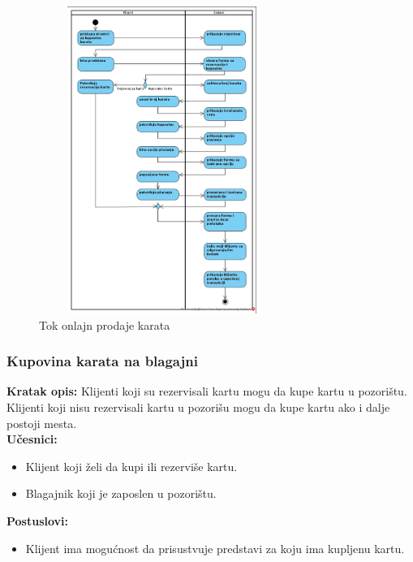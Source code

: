 \documentclass[a4paper]{article}
\begin{document}
        \newpage
        \begin{figure}[H]
          \begin{center}
              \includegraphics[width=80mm,height=100mm]{../images/activity_prodaja_karata.jpg}
          \end{center}
          \caption{Tok onlajn prodaje karata}
          \label{activity_prodaja_karata}
        \end{figure}

\subsubsection{Kupovina karata na blagajni}
\noindent\textbf{Kratak opis:} Klijenti koji su rezervisali kartu mogu da kupe kartu u pozorištu.
Klijenti koji nisu rezervisali kartu u pozorišu mogu da kupe kartu ako i dalje postoji mesta.\\

\noindent\textbf{Učesnici:} 
  \begin{itemize}
    \item Klijent koji želi da kupi ili rezerviše kartu.
    \item Blagajnik koji je zaposlen u pozorištu.
  \end{itemize}

  \noindent\textbf{Postuslovi:} 
  \begin{itemize}
    \item Klijent ima mogućnost da prisustvuje predstavi za koju ima kupljenu kartu.
  \end{itemize}
\end{document}
